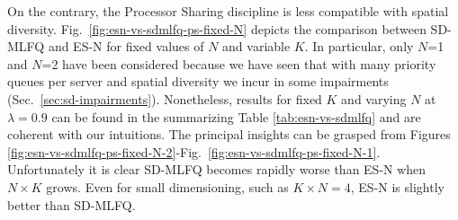 On the contrary, the Processor Sharing discipline is less compatible with spatial diversity. Fig.~\ref{fig:esn-vs-sdmlfq-ps-fixed-N} depicts the comparison between SD-MLFQ and ES-N for fixed values of $N$ and variable $K$. In particular, only $N$=1 and $N$=2 have been considered because we have seen that with many priority queues per server and spatial diversity we incur in some impairments (Sec.~\ref{sec:sd-impairments}). Nonetheless, results for fixed $K$ and varying $N$ at $\lambda = 0.9$ can be found in the summarizing Table \ref{tab:esn-vs-sdmlfq} and are coherent with our intuitions. The principal insights can be grasped from Figures \ref{fig:esn-vs-sdmlfq-ps-fixed-N-2}-Fig.~\ref{fig:esn-vs-sdmlfq-ps-fixed-N-1}.  Unfortunately it is clear SD-MLFQ becomes rapidly worse than ES-N when $N \times K$ grows. Even for small dimensioning, such as $K \times N = 4$, ES-N is slightly better than SD-MLFQ.
